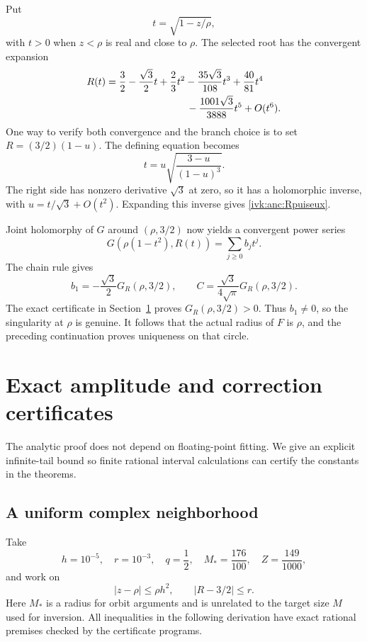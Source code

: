 \documentclass[11pt,letterpaper]{article}
\theoremstyle{remark}\newtheorem{remark}[theorem]{Remark}
\begin{document}
Put
\begin{equation}\label{ivk:anc:tdef}
 t=\sqrt{1-z/\rho},
\end{equation}
with $t>0$ when $z<\rho$ is real and close to $\rho$. The selected
root has the convergent expansion
\begin{equation}\label{ivk:anc:Rpuiseux}
 \begin{split}
 R(t)={}&\frac32-\frac{\sqrt3}{2}t+\frac23t^2
       -\frac{35\sqrt3}{108}t^3+\frac{40}{81}t^4\\
       &\hspace{24mm}-\frac{1001\sqrt3}{3888}t^5+O(t^6).
 \end{split}
\end{equation}
One way to verify both convergence and the branch choice is to set
$R=(3/2)(1-u)$. The defining equation becomes
\begin{equation}\label{ivk:anc:uimplicit}
 t=u\sqrt{\frac{3-u}{(1-u)^3}}.
\end{equation}
The right side has nonzero derivative $\sqrt3$ at zero, so it
has a holomorphic inverse, with $u=t/\sqrt3+O(t^2)$. Expanding
this inverse gives \eqref{ivk:anc:Rpuiseux}.

Joint holomorphy of $G$ around $(\rho,3/2)$ now yields a convergent
power series
\begin{equation}\label{ivk:anc:bseries}
 G(\rho(1-t^2),R(t))=\sum_{j\ge0}b_jt^j.
\end{equation}
The chain rule gives
\begin{equation}\label{ivk:anc:b1C}
 b_1=-\frac{\sqrt3}{2}G_R(\rho,3/2),\qquad
 C=\frac{\sqrt3}{4\sqrt\pi}G_R(\rho,3/2).
\end{equation}
The exact certificate in Section~\ref{ivk:anc:sec:certificate} proves
$G_R(\rho,3/2)>0$. Thus $b_1\ne0$, so the singularity at $\rho$
is genuine. It follows that the actual radius of $F$ is $\rho$,
and the preceding continuation proves uniqueness on that circle.

\section{Exact amplitude and correction certificates}\label{ivk:anc:sec:certificate}
The analytic proof does not depend on floating-point fitting.
We give an explicit infinite-tail bound so finite rational interval
calculations can certify the constants in the theorems.

\subsection{A uniform complex neighborhood}
Take
\begin{equation}\label{ivk:anc:certparams}
 h=10^{-5},\quad r=10^{-3},\quad q=\frac12,\quad
 M_*=\frac{176}{100},\quad Z=\frac{149}{1000},
\end{equation}
and work on
\begin{equation}\label{ivk:anc:certdisk}
 |z-\rho|\le\rho h^2,\qquad |R-3/2|\le r.
\end{equation}
Here $M_*$ is a radius for orbit arguments and is unrelated to
the target size $M$ used for inversion. All inequalities in the
following derivation have exact rational premises checked by the
certificate programs.
\end{document}
